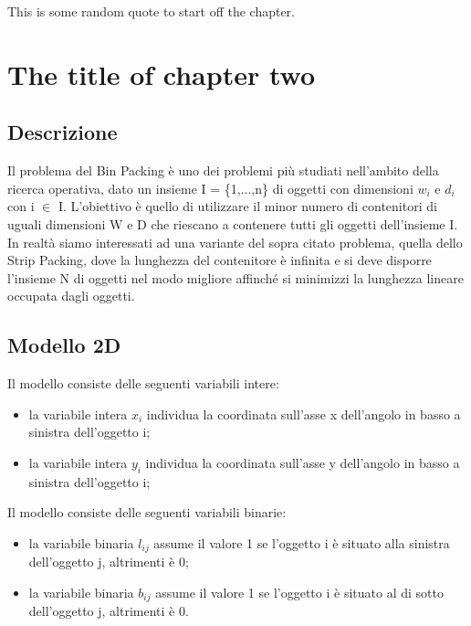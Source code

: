 \begin{savequote}[75mm]
This is some random quote to start off the chapter.
\end{savequote}

\chapter{The title of chapter two}
\label{chap:two}

\section{Descrizione}
Il problema del Bin Packing è uno dei problemi più studiati nell'ambito della ricerca operativa, dato un insieme I = \{1,...,n\} di oggetti con dimensioni $w_{i}$ e $d_{i}$ con i $\in$ I.
L'obiettivo è quello di utilizzare il minor numero di contenitori di uguali dimensioni W e D che riescano a contenere tutti gli oggetti dell'insieme I.
\newline
In realtà siamo interessati ad una variante del sopra citato problema, quella dello Strip Packing, dove la lunghezza del contenitore è infinita e si deve disporre l'insieme N di oggetti nel modo migliore affinché si minimizzi la lunghezza lineare occupata dagli oggetti.
\newpage
\section{Modello 2D}
Il modello consiste delle seguenti variabili intere:
\begin{itemize}
    \item la variabile intera $x_{i}$ individua la coordinata sull'asse x dell'angolo in basso a sinistra dell'oggetto i;
    \item la variabile intera $y_{i}$ individua la coordinata sull'asse y dell'angolo in basso a sinistra dell'oggetto i;
\end{itemize}
Il modello consiste delle seguenti variabili binarie:
\begin{itemize}
    \item la variabile binaria $l_{ij}$ assume il valore 1 se l'oggetto i è situato alla sinistra dell'oggetto j, altrimenti è 0;
    \item la variabile binaria $b_{ij}$ assume il valore 1 se l'oggetto i è situato al di sotto dell'oggetto j, altrimenti è 0.
\end{itemize}

